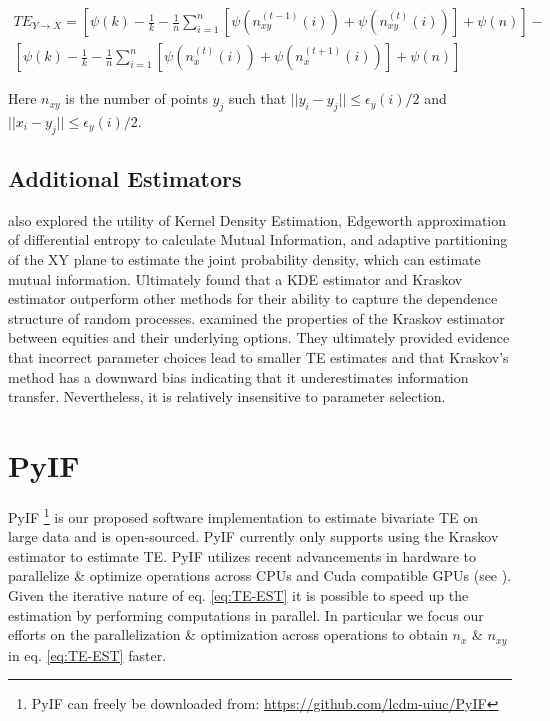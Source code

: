\setlength{\arraycolsep}{0.0em}
\begin{eqnarray}
TE_{Y \rightarrow X} =  \left[  \psi(k) - \frac{1}{k} - \frac{1}{n}  \sum_{i=1}^n [ \psi(n_{xy}^{(t-1)}(i)) + \psi(n_{xy}^{(t)}(i) ) ] + \psi(n) \right]   -  \nonumber\\
\left[  \psi(k) - \frac{1}{k} - \frac{1}{n}  \sum_{i=1}^n [ \psi(n_{x}^{(t)}(i)) + \psi(n_{x}^{(t+1)}(i) ) ] + \psi(n) \right]
\label{eq:TE-EST}
\end{eqnarray}
\setlength{\arraycolsep}{1pt}

\noindent  Here \(n_{xy}\) is the number of points \(y_j\) such that \(||y_i - y_j  || \leq \epsilon_y(i)/2\) and \(||x_i - y_j  || \leq \epsilon_y(i)/2\).

\subsection{Additional Estimators}
\cite{EstimatingTE} also explored the utility of Kernel Density Estimation, Edgeworth approximation of differential entropy to calculate Mutual Information, and adaptive partitioning of the XY plane to estimate the joint probability density, which can estimate mutual information. Ultimately \cite{EstimatingTE} found that a KDE estimator and Kraskov estimator outperform other methods for their ability to capture the dependence structure of random processes. \cite{JeffTE} examined the properties of the Kraskov estimator between equities and their underlying options. They ultimately provided evidence that incorrect parameter choices lead to smaller TE estimates and that Kraskov's method has a downward bias indicating that it underestimates information transfer. Nevertheless, it is relatively insensitive to parameter selection. 


\section{PyIF}

PyIF \footnote{PyIF can freely be downloaded from: \url{https://github.com/lcdm-uiuc/PyIF}} is our proposed software implementation to estimate bivariate TE on large data and is open-sourced.  PyIF currently only supports using the Kraskov estimator to estimate TE.  PyIF utilizes recent advancements in hardware to parallelize \& optimize operations across CPUs and Cuda compatible GPUs (see  \cite{CUDA}).  Given the iterative nature of eq. \ref{eq:TE-EST} it is possible to speed up the estimation by performing computations in parallel. In particular we focus our efforts on the parallelization \& optimization across operations to obtain \(n_x\)  \& \(n_{xy}\) in eq. \ref{eq:TE-EST} faster.

